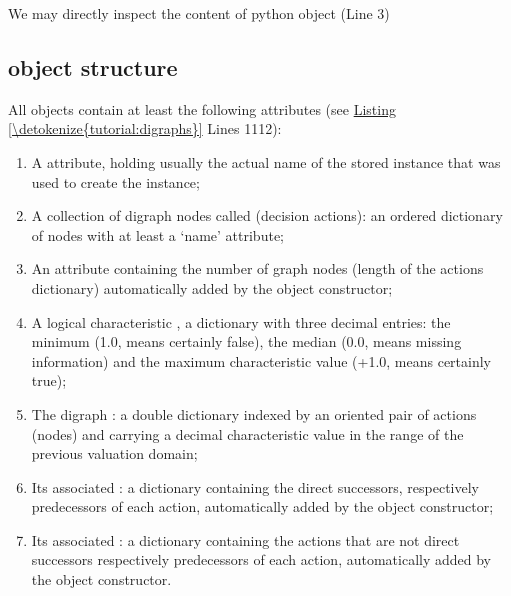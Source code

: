 \documentclass[a4paper,12pt,english]{sphinxhowto}
\begin{document}
We may directly inspect the content of python object  (Line 3)


\subsection{ object structure}
\label{\detokenize{tutorial:digraph-object-structure}}
All  objects contain at least the following attributes (see \hyperref[\detokenize{tutorial:digraphs}]{Listing \ref{\detokenize{tutorial:digraphs}}} Lines 11\sphinxhyphen{}12):
\begin{enumerate}
%
\setcounter{enumi}{-1}
\item {} 
A  attribute, holding usually the actual name of the stored instance that was used to create the instance;

\item {} 
A collection of digraph nodes called  (decision actions): an ordered dictionary of nodes with at least a ‘name’ attribute;

\item {} 
An  attribute containing the number of graph nodes (length of the actions dictionary) automatically added by the object constructor;

\item {} 
A logical characteristic , a dictionary with three decimal entries: the minimum (\sphinxhyphen{}1.0, means certainly false), the median (0.0, means missing information) and the maximum characteristic value (+1.0, means certainly true);

\item {} 
The digraph  : a double dictionary indexed by an oriented pair of actions (nodes) and carrying a decimal characteristic value in the range of the previous valuation domain;

\item {} 
Its associated  : a dictionary containing the direct successors, respectively predecessors of each action, automatically added by the object constructor;

\item {} 
Its associated  : a dictionary containing the actions that are not direct successors respectively predecessors of each action, automatically added by the object constructor.

\end{enumerate}
\end{document}
